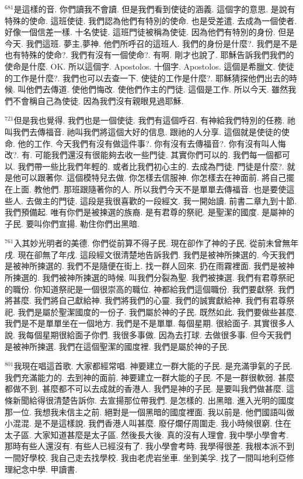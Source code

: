 \documentclass{book}
\begin{document}
$^{681}$是這樣的音.
你們讀我不會讀.
但是我們看到使徒的涵義.
這個字的意思.
是說有特殊的使命.
這班使徒.
我們認為他們有特別的使命.
也是受差遣.
去成為一個使者.
好像一個信差一樣.
十名使徒.
這班門徒被稱為使徒.
因為他們有特別的身份.
但是今天.
我們這班.
夢主,夢神.
他們所呼召的這班人.
我們的身份是什麼?.
我們是不是也有特殊的使命?.
我們有沒有一個使命?.
有啊.
剛才也說了.
耶穌告訴我們我們的使命是什麼.
OK.
所以這個字.
Apostolos.
十個字.
Apostolos.
這個是希臘文.
使徒的工作是什麼?.
我們也可以去查一下.
使徒的工作是什麼?.
耶穌猜探他們出去的時候.
叫他們去傳道.
使他們悔改.
使他們作主的門徒.
這個是工作.
所以今天.
雖然我們不會稱自己為使徒.
因為我們沒有親眼見過耶穌.

$^{721}$但是我也覺得.
我們也是一個使徒.
我們有這個呼召.
有神給我們特別的任務.
祂叫我們去傳福音.
祂叫我們將這個大好的信息.
跟祂的人分享.
這個就是使徒的使命.
他的工作.
今天我們有沒有做這件事?.
你有沒有去傳福音?.
你有沒有叫人悔改?.
有.
可能我們還沒有很能夠去收一些門徒.
其實你們可以的.
我們每一個都可以.
我們帶一些比我們年輕的.
或者比我們初心主的.
去成為門徒.
門徒是什麼?.
就是他可以跟著你.
這個模特兒去做.
你怎樣去信服神.
你怎樣去在神面前.
將自己擺在上面.
教他們.
那班跟隨著你的人.
所以我們今天不是單單去傳福音.
也是要使這些人.
去做主的門徒.
這段是我很喜歡的一段經文.
我一開始讀.
前書二章九到十節.
我們預備起.
唯有你們是被揀選的族裔.
是有君尊的祭祀.
是聖潔的國度.
是屬神的子民.
要叫你們宣揚.
勒住你們出黑暗.

$^{761}$入其妙光明者的美德.
你們從前算不得子民.
現在卻作了神的子民.
從前未曾無年戌.
現在卻無了年戌.
這段經文很清楚地告訴我們.
我們是被神所揀選的.
今天我們是被神所揀選的.
我們不是隨便在街上.
找一群人回來.
扔在雨霧裡面.
我們是被神所揀選的.
我們被神所揀選的時候.
叫我們分裂為聖.
我們被揀選.
我們有君尊祭祀的職份.
你知道祭祀是一個很崇高的職位.
神都給我們這個職份.
我們要獻祭.
我們將甚麼.
我們將自己獻給神.
我們將我們的心靈.
我們的誠實獻給神.
我們有君尊祭祀.
我們是屬於聖潔國度的一份子.
我們屬於神的子民.
既然如此.
我們要做些甚麼.
我們是不是單單坐在一個地方.
我們是不是單單.
每個星期.
很給面子.
其實很多人說.
我每個星期很給面子你們.
我很多事做.
因為去打球.
去做很多事.
但今天我們是被神所揀選.
我們在這個聖潔的國度裡.
我們是屬於神的子民.

$^{801}$我現在唱這首歌.
大家都經常唱.
神要建立一群大能的子民.
是充滿爭氣的子民.
我們充滿能力的.
去到神的面前.
神要建立一群大能的子民.
不是一群很軟弱.
甚麼都做不到.
甚麼都不可以去成就的香港人.
我們是神的子民.
是要叫我們做甚麼.
這條新聞給得很清楚告訴你.
去宣揚那位帶我們.
是怎樣的.
出黑暗.
進入光明的國度那一位.
我想我未信主之前.
絕對是一個黑暗的國度裡面.
我以前是.
他們國語叫做小混混.
是不是這樣說.
我們香港人叫甚麼.
廢仔爛仔周圍走.
我小時候很窮.
住在太子區.
大家知道甚麼是太子區.
然後長大後.
真的沒有人理會.
我中學小學會考.
那時有些人還沒有.
有些人已經沒有了.
我小學會考時.
我學得很差.
我根本派不到一間好學校.
我自己走去找學校.
我由老虎岩坐車.
坐到美孚.
找了一間叫地利亞修理紀念中學.
甲讀書.
\end{document}
